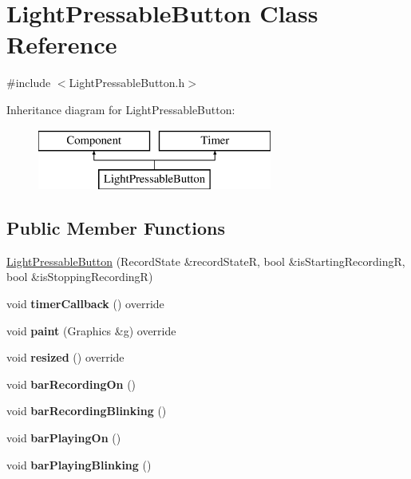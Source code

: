 \hypertarget{class_light_pressable_button}{}\section{Light\+Pressable\+Button Class Reference}
\label{class_light_pressable_button}


{\ttfamily \#include $<$Light\+Pressable\+Button.\+h$>$}

Inheritance diagram for Light\+Pressable\+Button\+:\begin{figure}[H]
\begin{center}
\leavevmode
\includegraphics[height=2.000000cm]{class_light_pressable_button}
\end{center}
\end{figure}
\subsection*{Public Member Functions}
\begin{DoxyCompactItemize}
\item 
\mbox{\hyperlink{class_light_pressable_button_a6a87109cc5937942c7dc9d7f468a81a9}{Light\+Pressable\+Button}} (Record\+State \&record\+StateR, bool \&is\+Starting\+RecordingR, bool \&is\+Stopping\+RecordingR)
\item 
\mbox{\label{class_light_pressable_button_ab418e6490c4daa03f6a329bcf42445da}} 
void {\bfseries timer\+Callback} () override
\item 
\mbox{\label{class_light_pressable_button_aaa29b376943a6c6037801084669f51ed}} 
void {\bfseries paint} (Graphics \&g) override
\item 
\mbox{\label{class_light_pressable_button_ae29df49e8a52cdce0128fd8858b4e025}} 
void {\bfseries resized} () override
\item 
\mbox{\label{class_light_pressable_button_a09793c6cb81c567724ecca01e1427fb1}} 
void {\bfseries bar\+Recording\+On} ()
\item 
\mbox{\label{class_light_pressable_button_a0b8f9dadd194641b40ddda0c5f163280}} 
void {\bfseries bar\+Recording\+Blinking} ()
\item 
\mbox{\label{class_light_pressable_button_a0de43526261a784b2245bcb2dbf12f40}} 
void {\bfseries bar\+Playing\+On} ()
\item 
\mbox{\label{class_light_pressable_button_a82757d7ab722e41e5c11cdccd3beac74}} 
void {\bfseries bar\+Playing\+Blinking} ()
\end{DoxyCompactItemize}

